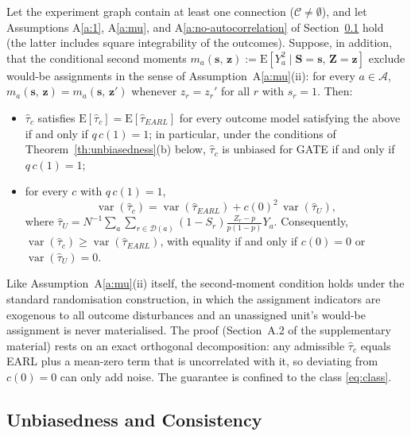 \documentclass[sigconf,anonymous,review]{acmart}
\newcommand{\E}{\mathrm E}
\DeclareMathOperator{\var}{var}
\begin{document}
\begin{proposition}\label{prop:optimality}
    Let the experiment graph contain at least one connection ($\mathcal C\neq\emptyset$), and let Assumptions A\ref{a:1}, A\ref{a:mu}, and A\ref{a:no-autocorrelation} of Section~\ref{subsec:analysis} hold (the latter includes square integrability of the outcomes). Suppose, in addition, that the conditional second moments $m_a(\mathbf s,\,\mathbf z) := \E[Y_a^2\mid \mathbf S=\mathbf s,\,\mathbf Z=\mathbf z]$ exclude would-be assignments in the sense of Assumption~A\ref{a:mu}(ii): for every $a\in\mathcal A$, $m_a(\mathbf s,\,\mathbf z) = m_a(\mathbf s,\,\mathbf z')$ whenever $z_r=z_r'$ for all $r$ with $s_r=1$. Then:
    \begin{itemize}
        \item[\textup{(a)}] $\hat\tau_c$ satisfies $\E[\hat\tau_c]=\E[\hat\tau_{EARL}]$ for every outcome model satisfying the above if and only if $q\,c(1)=1$; in particular, under the conditions of Theorem~\ref{th:unbiasedness}(b) below, $\hat\tau_c$ is unbiased for GATE if and only if $q\,c(1)=1$;
        \item[\textup{(b)}] for every $c$ with $q\,c(1)=1$,
        \begin{equation*}
        \var(\hat\tau_c) = \var(\hat\tau_{EARL}) + c(0)^2\,\var(\hat\tau_U),
        \end{equation*}
        where $\hat\tau_U = N^{-1}\sum_{a}\sum_{r\in\mathcal D(a)}(1-S_r)\frac{Z_r-p}{p(1-p)}Y_a$. Consequently, $\var(\hat\tau_c) \ge \var(\hat\tau_{EARL})$, with equality if and only if $c(0)=0$ or $\var(\hat\tau_U)=0$.
    \end{itemize}
\end{proposition}

Like Assumption~A\ref{a:mu}(ii) itself, the second-moment condition holds under the standard randomisation construction, in which the assignment indicators are exogenous to all outcome disturbances and an unassigned unit's would-be assignment is never materialised. The proof (Section~A.2 of the supplementary material) rests on an exact orthogonal decomposition: any admissible $\hat\tau_c$ equals EARL plus a mean-zero term that is uncorrelated with it, so deviating from $c(0)=0$ can only add noise. The guarantee is confined to the class \eqref{eq:class}.

\subsection{Unbiasedness and Consistency}\label{subsec:analysis}
\end{document}
